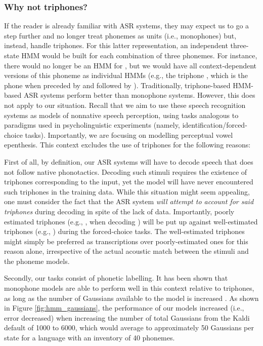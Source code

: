 \subsubsection{Why not triphones?}
If the reader is already familiar with ASR systems, they may expect us to go a step further and no longer treat phonemes as units (i.e., monophones) but, instead, handle triphones. For this latter representation, an independent three-state HMM would be built for each combination of three phonemes. For instance, there would no longer be an HMM for , but we would have all context-dependent versions of this phoneme as individual HMMs (e.g., the triphone , which is the phone  when preceded by  and followed by ).
Traditionally, triphone-based HMM-based ASR systems perform better than monophone systems. However, this does not apply to our situation. Recall that we aim to use these speech recognition systems as models of nonnative speech perception, using tasks analogous to paradigms used in psycholinguistic experiments (namely, identification/forced-choice tasks). Importantly, we are focusing on modelling perceptual vowel epenthesis. This context excludes the use of triphones for the following reasons:
\begin{enumerate}
\item First of all, by definition, our ASR systems will have to decode speech that does not follow native phonotactics. Decoding such stimuli requires the existence of triphones corresponding to the input, yet the model will have never encountered such triphones in the training data. While this situation might seem appealing, one must consider the fact that the ASR system \textit{will attempt to account for said triphones} during decoding in spite of the lack of data. Importantly, poorly estimated triphones (e.g., , when decoding ) will be put up against well-estimated triphones (e.g., ) during the forced-choice tasks. The well-estimated triphones might simply be preferred as transcriptions over poorly-estimated ones for this reason alone, irrespective of the actual acoustic match between the stimuli and the phoneme models.
{\color{red}  \item Secondly, our tasks consist of phonetic labelling. It has been shown that monophone models are able to perform well in this context relative to triphones, as long as the number of Gaussians available to the model is increased {\color{red}\cite{saraclar2001}}. As shown in Figure \ref{fig:hmm_gaussians}, the performance of our models increased (i.e., error decreased) when increasing the number of total Gaussians from the Kaldi default of 1000 to 6000, which would average to approximately 50 Gaussians per state for a language with an inventory of 40 phonemes.}   
  \end{enumerate}

